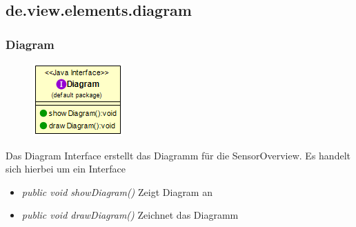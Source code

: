 \subsection{de.view.elements.diagram}

\subsubsection{Diagram}
\begin{minipage}{0.3\textwidth}
    \begin{figure}[H]
        \includegraphics[scale = 0.5
        ]{media/view/diagram/Diagram_Class.png}
    \end{figure}
    \end{minipage} \hfill
    \begin{minipage}{0.6\textwidth}
Das Diagram Interface erstellt das Diagramm für die SensorOverview. Es handelt sich hierbei um ein Interface
\end{minipage}
\begin{itemize} [noitemsep]
    \item \emph{public void showDiagram()} Zeigt Diagram an
    \item \emph{public void drawDiagram()} Zeichnet das Diagramm
\end{itemize}

